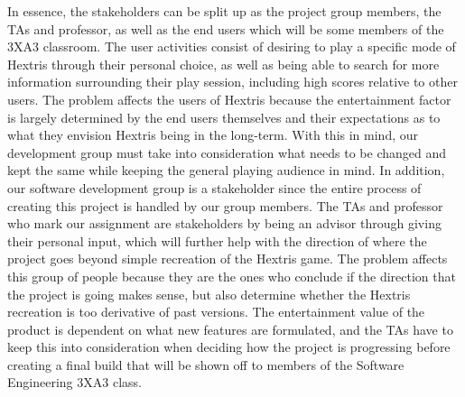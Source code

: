 \documentclass[12pt]{article}
\begin{document}
In essence, the stakeholders can be split up as the project group members, the TAs and professor, as well as the end users which will  be some members of the 3XA3 classroom. The user activities consist of desiring to play a specific mode of Hextris through their personal choice, as well as being able to search for more information surrounding their play session, including high scores relative to other users. The problem affects the users of Hextris because the entertainment factor is largely determined by the end users themselves and their expectations as to what they envision Hextris being in the long-term. With this in mind, our development group must take into consideration what needs to be changed and kept the same while keeping the general playing audience in mind. In addition, our software development group is a stakeholder since the entire process of creating this project is handled by our group members. The TAs and professor who mark our assignment are stakeholders by being an advisor through giving their personal input, which will further help with the direction of where the project goes beyond simple recreation of the Hextris game. The problem affects this group of people because they are the ones who conclude if the direction that the project is going makes sense, but also determine whether the Hextris recreation is too derivative of past versions. The entertainment value of the product is dependent on what new features are formulated, and the TAs have to keep this into consideration when deciding how the project is progressing before creating a final build that will be shown off to members of the Software Engineering 3XA3 class.\\
\end{document}
